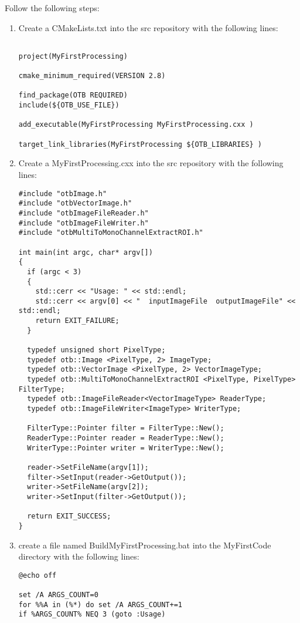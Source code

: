 Follow the following steps:
\begin{enumerate}
\item Create a CMakeLists.txt into the src repository with the following lines:


\begin{verbatim}

project(MyFirstProcessing)

cmake_minimum_required(VERSION 2.8)

find_package(OTB REQUIRED)
include(${OTB_USE_FILE})

add_executable(MyFirstProcessing MyFirstProcessing.cxx )

target_link_libraries(MyFirstProcessing ${OTB_LIBRARIES} )
\end{verbatim}

\item Create a MyFirstProcessing.cxx into the src repository with the following lines:
\begin{verbatim}
#include "otbImage.h"
#include "otbVectorImage.h"
#include "otbImageFileReader.h"
#include "otbImageFileWriter.h"
#include "otbMultiToMonoChannelExtractROI.h"

int main(int argc, char* argv[])
{
  if (argc < 3)
  {
    std::cerr << "Usage: " << std::endl;
    std::cerr << argv[0] << "  inputImageFile  outputImageFile" << std::endl;
    return EXIT_FAILURE;
  }

  typedef unsigned short PixelType;
  typedef otb::Image <PixelType, 2> ImageType;
  typedef otb::VectorImage <PixelType, 2> VectorImageType;
  typedef otb::MultiToMonoChannelExtractROI <PixelType, PixelType> FilterType;
  typedef otb::ImageFileReader<VectorImageType> ReaderType;
  typedef otb::ImageFileWriter<ImageType> WriterType;

  FilterType::Pointer filter = FilterType::New();
  ReaderType::Pointer reader = ReaderType::New();
  WriterType::Pointer writer = WriterType::New();

  reader->SetFileName(argv[1]);
  filter->SetInput(reader->GetOutput());
  writer->SetFileName(argv[2]);
  writer->SetInput(filter->GetOutput());

  return EXIT_SUCCESS;
}
\end{verbatim}
\item create a file named BuildMyFirstProcessing.bat into the MyFirstCode directory with the following lines:
\begin{verbatim}
@echo off

set /A ARGS_COUNT=0    
for %%A in (%*) do set /A ARGS_COUNT+=1  
if %ARGS_COUNT% NEQ 3 (goto :Usage)


\end{verbatim}
\end{enumerate}
